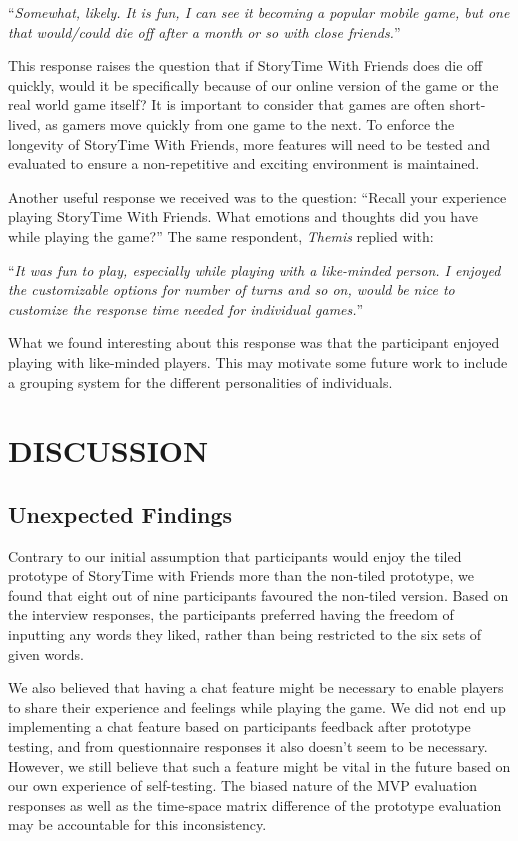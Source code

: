 \documentclass{sigchi}
\begin{document}
``\textit{Somewhat, likely. It is fun, I can see it becoming a popular mobile game, but one that would/could die off after a month or so with close friends.}''

This response raises the question that if StoryTime With Friends does die off quickly, would it be specifically because of our online version of the game or the real world game itself? It is important to consider that games are often short-lived, as gamers move quickly from one game to the next. To enforce the longevity of StoryTime With Friends, more features will need to be tested and evaluated to ensure a non-repetitive and exciting environment is maintained. 

Another useful response we received was to the question: ``Recall your experience playing StoryTime With Friends. What emotions and thoughts did you have while playing the game?'' The same respondent, \textit{Themis} replied with:

``\textit{It was fun to play, especially while playing with a like-minded person. I enjoyed the customizable options for number of turns and so on, would be nice to customize the response time needed for individual games.}''

What we found interesting about this response was that the participant enjoyed playing with like-minded players. This may motivate some future work to include a grouping system for the different personalities of individuals.  

\section{DISCUSSION}
\subsection{Unexpected Findings}
Contrary to our initial assumption that participants would enjoy the tiled prototype of StoryTime with Friends more than the non-tiled prototype, we found that eight out of nine participants favoured the non-tiled version. Based on the interview responses, the participants preferred having the freedom of inputting any words they liked, rather than being restricted to the six sets of given words.

We also believed that having a chat feature might be necessary to enable players to share their experience and feelings while playing the game. We did not end up implementing a chat feature based on participants feedback after prototype testing, and from questionnaire responses it also doesn't seem to be necessary. However, we still believe that such a feature might be vital in the future based on our own experience of self-testing. The biased nature of the MVP evaluation responses as well as the time-space matrix difference of the prototype evaluation may be accountable for this inconsistency.
\end{document}
